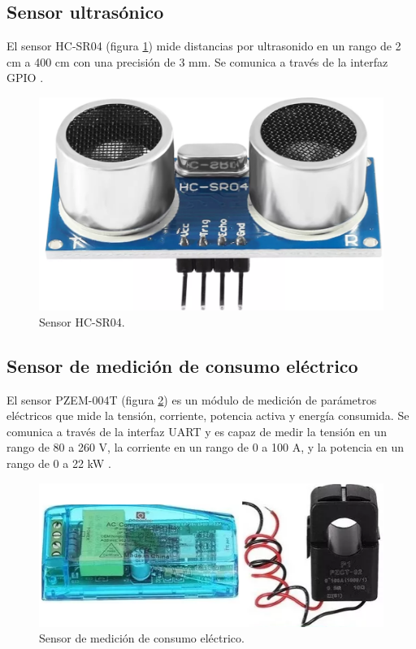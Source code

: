 \subsection{Sensor ultrasónico}

El sensor HC-SR04 (figura \ref{fig:HC-SR04}) mide distancias por ultrasonido en
un rango de 2 cm a 400 cm con una precisión de 3 mm. Se comunica a través de la
interfaz GPIO \cite{HC-SR04}.

\begin{figure}[H]
	\centering
	\includegraphics[height=.15\textwidth]{./Images/11.png}
	\caption{Sensor HC-SR04\protect\footnotemark.}
	\label{fig:HC-SR04}
\end{figure}


\subsection{Sensor de medición de consumo eléctrico}

El sensor PZEM-004T (figura \ref{fig:PZEM-004T}) es un módulo de medición de
parámetros eléctricos que mide la tensión, corriente, potencia activa y energía
consumida. Se comunica a través de la interfaz UART y es capaz de medir la
tensión en un rango de 80 a 260 V, la corriente en un rango de 0 a 100 A, y la
potencia en un rango de 0 a 22 kW \cite{PZEM-004T}.

\begin{figure}[H]
	\centering
	\includegraphics[height=.15\textwidth]{./Images/12.png}
	\caption{Sensor de medición de consumo eléctrico\protect\footnotemark.}
	\label{fig:PZEM-004T}
\end{figure}


